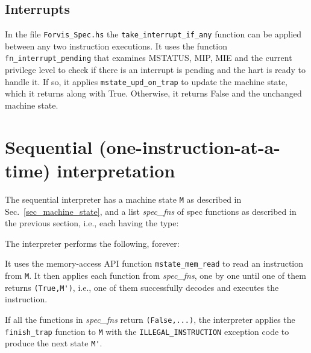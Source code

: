 \documentclass[11pt]{article}
\newcommand{\hmm}{\hspace*{2em}}
\newcommand{\hmmm}{\hspace*{3em}}
\begin{document}



\subsection{Interrupts}

\label{sec_interrupts}



In the file \verb|Forvis_Spec.hs| the \verb|take_interrupt_if_any|
function can be applied between any two instruction executions. It
uses the function \verb|fn_interrupt_pending| that examines MSTATUS,
MIP, MIE and the current privilege level to check if there is an
interrupt is pending and the hart is ready to handle it.  If so, it
applies \verb|mstate_upd_on_trap| to update the machine state, which
it returns along with True.  Otherwise, it returns False and the
unchanged machine state.


\section{Sequential (one-instruction-at-a-time)  interpretation}

The sequential interpreter has a machine state \verb|M| as described
in Sec.~\ref{sec_machine_state}, and a list \emph{spec\_fns} of spec
functions as described in the previous section, i.e., each having the
type:

\hmmm {\tt Machine\_State -> Instr -> (Bool, Machine\_State)}

The interpreter performs the following, forever:

\hmm \begin{minipage}[t]{5in}

It uses the memory-access API function \verb|mstate_mem_read| to read
an instruction from \verb|M|.  It then applies each function from
\emph{spec\_fns}, one by one until one of them returns
\verb|(True,M')|, i.e., one of them successfully decodes and executes
the instruction.

\vspace*{1ex}

If all the functions in \emph{spec\_fns} return \verb|(False,...)|,
the interpreter applies the \verb|finish_trap| function to \verb|M|
with the \verb|ILLEGAL_INSTRUCTION| exception code to produce the next
state \verb|M'|.

\end{minipage}
\end{document}
